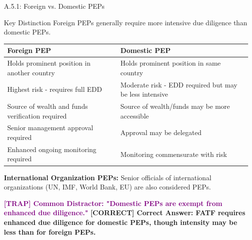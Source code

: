 \documentclass[11pt,a4paper]{beamer}
\newcommand{\trap}[1]{\textcolor{purple}{\textbf{[TRAP] #1}}}
\newcommand{\correct}[1]{\textcolor{green!50!black}{\textbf{[CORRECT] #1}}}
\begin{document}
	\begin{frame}{A.5.1: Foreign vs. Domestic PEPs}
		\begin{block}{Key Distinction}
			Foreign PEPs generally require more intensive due diligence than domestic PEPs.
		\end{block}
		\begin{tabular}{p{}|p{}}
			\hline
			\rowcolor{lightgray}
			\textbf{Foreign PEP} & \textbf{Domestic PEP} \\
			\hline
			Holds prominent position in another country & Holds prominent position in same country \\
			Highest risk - requires full EDD & Moderate risk - EDD required but may be less intensive \\
			Source of wealth and funds verification required & Source of wealth/funds may be more accessible \\
			Senior management approval required & Approval may be delegated \\
			Enhanced ongoing monitoring required & Monitoring commensurate with risk \\
			\hline
		\end{tabular}
		\vspace{0.2cm}
		\textbf{International Organization PEPs:}
		Senior officials of international organizations (UN, IMF, World Bank, EU) are also considered PEPs.
		
		\trap{Common Distractor: "Domestic PEPs are exempt from enhanced due diligence."}
		\correct{Correct Answer: FATF requires enhanced due diligence for domestic PEPs, though intensity may be less than for foreign PEPs.}
	\end{frame}
	
\end{document}
